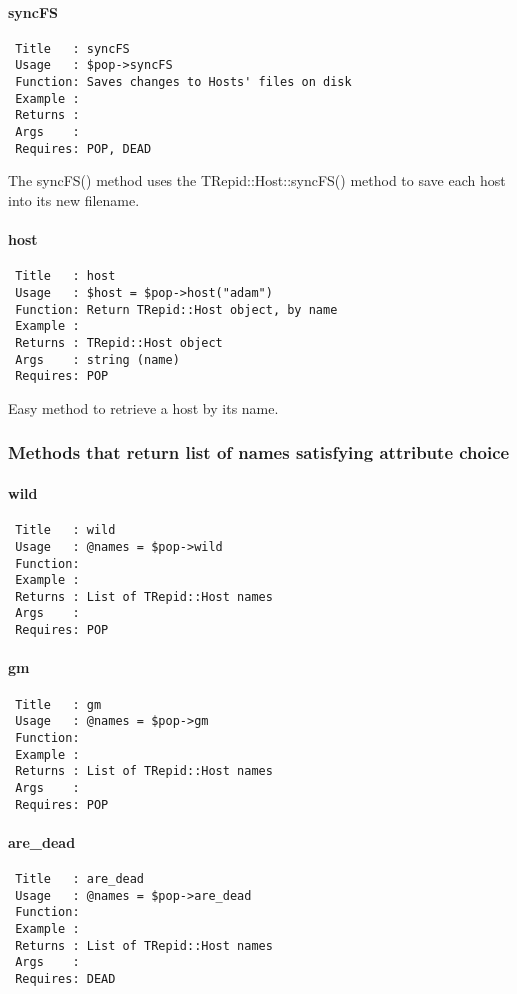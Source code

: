 \paragraph*{syncFS\label{syncFS}}
\begin{verbatim}
 Title   : syncFS
 Usage   : $pop->syncFS
 Function: Saves changes to Hosts' files on disk
 Example :
 Returns :
 Args    :
 Requires: POP, DEAD
\end{verbatim}


The syncFS() method uses the TRepid::Host::syncFS() method to save each
host into its new filename.

\paragraph*{host\label{host}}
\begin{verbatim}
 Title   : host
 Usage   : $host = $pop->host("adam")
 Function: Return TRepid::Host object, by name
 Example : 
 Returns : TRepid::Host object
 Args    : string (name)
 Requires: POP
\end{verbatim}


Easy method to retrieve a host by its name.

\subsubsection*{Methods that return list of names satisfying attribute choice\label{Methods_that_return_list_of_names_satisfying_attribute_choice}}
\paragraph*{wild\label{wild}}
\begin{verbatim}
 Title   : wild
 Usage   : @names = $pop->wild
 Function: 
 Example :
 Returns : List of TRepid::Host names
 Args    : 
 Requires: POP
\end{verbatim}
\paragraph*{gm\label{gm}}
\begin{verbatim}
 Title   : gm
 Usage   : @names = $pop->gm
 Function: 
 Example : 
 Returns : List of TRepid::Host names
 Args    : 
 Requires: POP
\end{verbatim}
\paragraph*{are\_dead\label{are_dead}}
\begin{verbatim}
 Title   : are_dead
 Usage   : @names = $pop->are_dead
 Function: 
 Example : 
 Returns : List of TRepid::Host names
 Args    : 
 Requires: DEAD
\end{verbatim}


